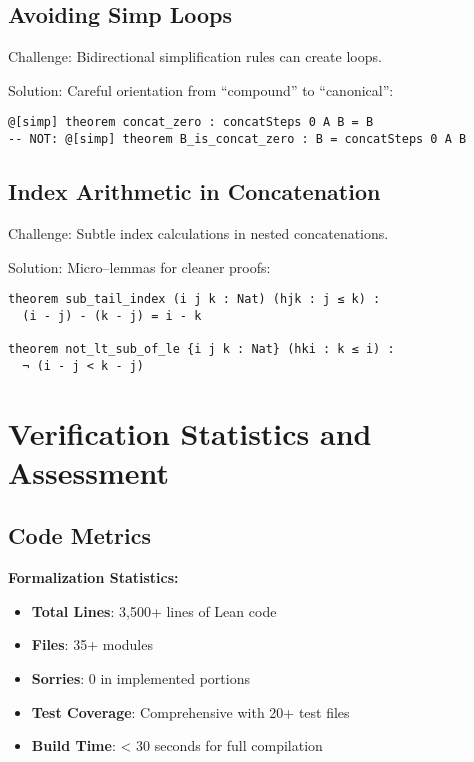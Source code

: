 \documentclass[11pt]{article}
\newif\iffullversion
\theoremstyle{definition}
\theoremstyle{remark}
\begin{document}
\subsection{Avoiding Simp Loops}

Challenge: Bidirectional simplification rules can create loops.

Solution: Careful orientation from ``compound'' to ``canonical'':
\begin{lstlisting}[language={}]
@[simp] theorem concat_zero : concatSteps 0 A B = B
-- NOT: @[simp] theorem B_is_concat_zero : B = concatSteps 0 A B
\end{lstlisting}

\subsection{Index Arithmetic in Concatenation}

Challenge: Subtle index calculations in nested concatenations.

Solution: Micro--lemmas for cleaner proofs:
\begin{lstlisting}[language={}]
theorem sub_tail_index (i j k : Nat) (hjk : j ≤ k) :
  (i - j) - (k - j) = i - k

theorem not_lt_sub_of_le {i j k : Nat} (hki : k ≤ i) :
  ¬ (i - j < k - j)
\end{lstlisting}
\fi %

\iffullversion
\section{Verification Statistics and Assessment}

\subsection{Code Metrics}

\begin{mdframed}[style=technical]
\textbf{Formalization Statistics:}
\begin{itemize}
\item \textbf{Total Lines}: 3,500+ lines of Lean code
\item \textbf{Files}: 35+ modules
\item \textbf{Sorries}: 0 in implemented portions
\item \textbf{Test Coverage}: Comprehensive with 20+ test files
\item \textbf{Build Time}: < 30 seconds for full compilation
\end{itemize}
\end{mdframed}
\end{document}
